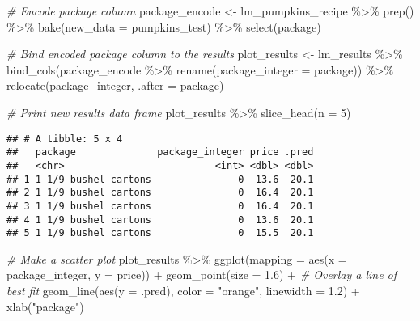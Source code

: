 \documentclass[
]{article}
\newenvironment{Shaded}{\begin{snugshade}}{\end{snugshade}}
\newcommand{\AttributeTok}[1]{\textcolor[rgb]{0.77,0.63,0.00}{#1}}
\newcommand{\CommentTok}[1]{\textcolor[rgb]{0.56,0.35,0.01}{\textit{#1}}}
\newcommand{\DecValTok}[1]{\textcolor[rgb]{0.00,0.00,0.81}{#1}}
\newcommand{\FloatTok}[1]{\textcolor[rgb]{0.00,0.00,0.81}{#1}}
\newcommand{\FunctionTok}[1]{\textcolor[rgb]{0.00,0.00,0.00}{#1}}
\newcommand{\NormalTok}[1]{#1}
\newcommand{\OtherTok}[1]{\textcolor[rgb]{0.56,0.35,0.01}{#1}}
\newcommand{\SpecialCharTok}[1]{\textcolor[rgb]{0.00,0.00,0.00}{#1}}
\newcommand{\StringTok}[1]{\textcolor[rgb]{0.31,0.60,0.02}{#1}}
\begin{document}
\begin{Shaded}
\begin{Highlighting}[]
\CommentTok{\# Encode package column}
\NormalTok{package\_encode }\OtherTok{\textless{}{-}}\NormalTok{ lm\_pumpkins\_recipe }\SpecialCharTok{\%\textgreater{}\%} 
  \FunctionTok{prep}\NormalTok{() }\SpecialCharTok{\%\textgreater{}\%} 
  \FunctionTok{bake}\NormalTok{(}\AttributeTok{new\_data =}\NormalTok{ pumpkins\_test) }\SpecialCharTok{\%\textgreater{}\%} 
  \FunctionTok{select}\NormalTok{(package)}


\CommentTok{\# Bind encoded package column to the results}
\NormalTok{ plot\_results }\OtherTok{\textless{}{-}}\NormalTok{ lm\_results }\SpecialCharTok{\%\textgreater{}\%}
 \FunctionTok{bind\_cols}\NormalTok{(package\_encode }\SpecialCharTok{\%\textgreater{}\%}
               \FunctionTok{rename}\NormalTok{(}\AttributeTok{package\_integer =}\NormalTok{ package)) }\SpecialCharTok{\%\textgreater{}\%}
  \FunctionTok{relocate}\NormalTok{(package\_integer, }\AttributeTok{.after =}\NormalTok{ package)}

\CommentTok{\# Print new results data frame}
\NormalTok{plot\_results }\SpecialCharTok{\%\textgreater{}\%}
  \FunctionTok{slice\_head}\NormalTok{(}\AttributeTok{n =} \DecValTok{5}\NormalTok{)}
\end{Highlighting}
\end{Shaded}

\begin{verbatim}
## # A tibble: 5 x 4
##   package              package_integer price .pred
##   <chr>                          <int> <dbl> <dbl>
## 1 1 1/9 bushel cartons               0  13.6  20.1
## 2 1 1/9 bushel cartons               0  16.4  20.1
## 3 1 1/9 bushel cartons               0  16.4  20.1
## 4 1 1/9 bushel cartons               0  13.6  20.1
## 5 1 1/9 bushel cartons               0  15.5  20.1
\end{verbatim}

\begin{Shaded}
\begin{Highlighting}[]
\CommentTok{\# Make a scatter plot}
\NormalTok{plot\_results }\SpecialCharTok{\%\textgreater{}\%}
  \FunctionTok{ggplot}\NormalTok{(}\AttributeTok{mapping =} \FunctionTok{aes}\NormalTok{(}\AttributeTok{x =}\NormalTok{ package\_integer, }\AttributeTok{y =}\NormalTok{ price)) }\SpecialCharTok{+}
   \FunctionTok{geom\_point}\NormalTok{(}\AttributeTok{size =} \FloatTok{1.6}\NormalTok{) }\SpecialCharTok{+}
   \CommentTok{\# Overlay a line of best fit}
   \FunctionTok{geom\_line}\NormalTok{(}\FunctionTok{aes}\NormalTok{(}\AttributeTok{y =}\NormalTok{ .pred), }\AttributeTok{color =} \StringTok{"orange"}\NormalTok{, }\AttributeTok{linewidth =} \FloatTok{1.2}\NormalTok{) }\SpecialCharTok{+}
   \FunctionTok{xlab}\NormalTok{(}\StringTok{"package"}\NormalTok{)}
\end{Highlighting}
\end{Shaded}
\end{document}
